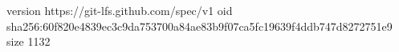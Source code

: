 version https://git-lfs.github.com/spec/v1
oid sha256:60f820e4839ec3c9da753700a84ae83b9f07ca5fc19639f4ddb747d8272751e9
size 1132
